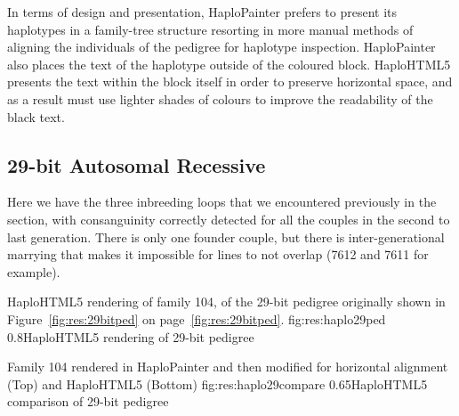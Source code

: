 In terms of design and presentation, HaploPainter prefers to present its haplotypes in a family-tree structure resorting in more manual methods of aligning the individuals of the pedigree for haplotype inspection. HaploPainter also places the text of the haplotype outside of the coloured block. HaploHTML5 presents the text within the block itself in order to preserve horizontal space, and as a result must use lighter shades of colours to improve the readability of the black text.



\subsection{29-bit Autosomal Recessive}

Here we have the three inbreeding loops that we encountered previously in the section, with consanguinity correctly detected for all the couples in the second to last generation.  There is only one founder couple, but there is inter-generational marrying that makes it impossible for lines to not overlap (7612 and 7611 for example).

	{HaploHTML5 rendering of family 104, of the 29-bit pedigree originally shown in Figure~\ref{fig:res:29bitped} on page~\ref{fig:res:29bitped}.}
	{fig:res:haplo29ped}
	{0.8}{HaploHTML5 rendering of 29-bit pedigree}
	
	{Family 104 rendered in HaploPainter and then modified for horizontal alignment (Top) and HaploHTML5 (Bottom)}
	{fig:res:haplo29compare}
	{0.65}{HaploHTML5 comparison of 29-bit pedigree}

